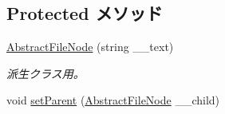 \subsection*{Protected メソッド}
\begin{DoxyCompactItemize}
\item 
\hyperlink{classlazurite_1_1attitude_1_1_abstract_file_node_a4c5fd784fdd09f1c3c6bdbe7c3a4f89c}{AbstractFileNode} (string \_\-\_\-text)
\begin{DoxyCompactList}\small\item\em 派生クラス用。 \item\end{DoxyCompactList}\item 
void \hyperlink{classlazurite_1_1attitude_1_1_abstract_file_node_a3625419d7cf9f8332361b4a2bedef953}{setParent} (\hyperlink{classlazurite_1_1attitude_1_1_abstract_file_node}{AbstractFileNode} \_\-\_\-child)
\end{DoxyCompactItemize}
